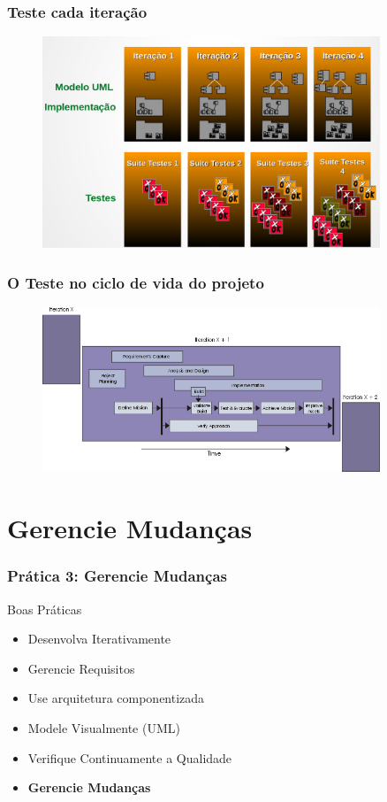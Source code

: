 \begin{frame}
\frametitle{Teste cada iteração}
\begin{figure}
   \centering
   \includegraphics[width = 0.9\textwidth]{figs/fig16.png}
  \end{figure}
\end{frame}

\begin{frame}
\frametitle{O Teste no ciclo de vida do projeto}
\begin{figure}
   \centering
   \includegraphics[width = 0.9\textwidth]{figs/fig17.png}
  \end{figure}
\end{frame}

\section{Gerencie Mudanças }
\begin{frame}
 \frametitle{Prática 3: Gerencie Mudanças }
 \begin{block}{Boas Práticas}
 \begin{itemize}
  \item Desenvolva Iterativamente
  \item Gerencie Requisitos
  \item Use arquitetura componentizada
  \item  Modele Visualmente (UML)	
  \item  Verifique Continuamente a Qualidade
  \item \textbf{Gerencie Mudanças}
 \end{itemize}
\end{block}
\end{frame}

